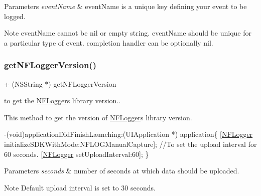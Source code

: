 \begin{DoxyParams}{Parameters}
{\em event\+Name} & event\+Name is a unique key defining your event to be logged. \\
\hline
\end{DoxyParams}
\begin{DoxyNote}{Note}
event\+Name cannot be nil or empty string. event\+Name should be unique for a particular type of event. completion handler can be optionally nil. 
\end{DoxyNote}
\mbox{\label{interface_n_f_logger_af6ab573a8e6498e7a50e74a022025b91}} 
\subsubsection{\texorpdfstring{get\+N\+F\+Logger\+Version()}{getNFLoggerVersion()}}
{\footnotesize\ttfamily + (N\+S\+String $\ast$) get\+N\+F\+Logger\+Version \begin{DoxyParamCaption}{ }\end{DoxyParamCaption}}



to get the \hyperlink{interface_n_f_logger}{N\+F\+Logger}\textquotesingle{}s library version.. 

This method to get the version of \hyperlink{interface_n_f_logger}{N\+F\+Logger}\textquotesingle{}s library version.


\begin{DoxyCode}
-(void)applicationDidFinishLaunching:(UIApplication *) application\{
     [\hyperlink{interface_n_f_logger}{NFLogger} initializeSDKWithMode:NFLOGManualCapture];
     \textcolor{comment}{//To set the upload interval for 60 seconds.}
     [\hyperlink{interface_n_f_logger}{NFLogger} setUploadInterval:60];
\}
\end{DoxyCode}



\begin{DoxyParams}{Parameters}
{\em seconds} & number of seconds at which data should be uploaded.\\
\hline
\end{DoxyParams}
\begin{DoxyNote}{Note}
Default upload interval is set to 30 seconds. 
\end{DoxyNote}
\mbox{\label{interface_n_f_logger_a1bfc37639bda4740700d9c76027cad1f}} 
